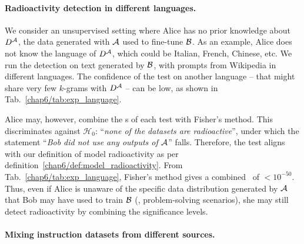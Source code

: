 \paragraph*{Radioactivity detection in different languages.}\label{chap6/par:distrib}
We consider an unsupervised setting where Alice has no prior knowledge about $D^\mathcal A$, the data generated with $\mathcal A$ used to fine-tune $\mathcal B$.
As an example, Alice does not know the language of $D^\mathcal A$, which could be Italian, French, Chinese, etc. 
We run the detection on text generated by $\mathcal B$, with prompts from Wikipedia in different languages.
The confidence of the test on another language -- that might share very few $k$-grams with $D^\mathcal A$ -- can be low, as shown in Tab.~\ref{chap6/tab:exp_language}.

Alice may, however, combine the \pval s of each test with Fisher's method.  
This discriminates against $\mathcal{H}_0$: ``\textit{none of the datasets are radioactive}'', under which the statement ``\textit{Bob did not use any outputs of $\mathcal A$}'' falls.
Therefore, the test aligns with our definition of model radioactivity as per definition~\ref{chap6/def:model_radioactivity}.
From Tab.~\ref{chap6/tab:exp_language}, Fisher's method gives a combined \pval\ of $<10^{-50}$. 
Thus, even if Alice is unaware of the specific data distribution generated by $\mathcal A$ that Bob may have used to train $\mathcal B$ (\eg, problem-solving scenarios), she may still detect radioactivity by combining the significance levels.

\paragraph*{Mixing instruction datasets from different sources.}


